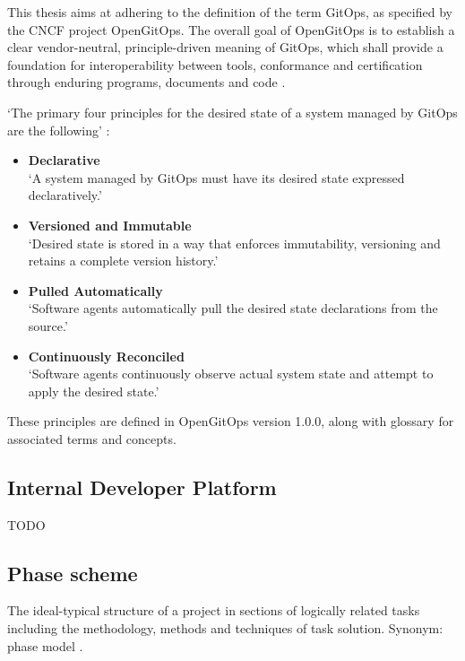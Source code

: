 This thesis aims at adhering to the definition of the term GitOps,
as specified by the CNCF project OpenGitOps.
The overall goal of OpenGitOps is to establish a clear vendor-neutral,
principle-driven meaning of GitOps,
which shall provide a foundation for interoperability between tools, conformance and certification through enduring programs, documents and code
\autocite{opengitopsDocuments}.

\noindent
\enquote*{The primary four principles
	for the desired state of a
	system managed by GitOps are the following} \autocite{gitopsPrinciplesv100}:

\begin{itemize}
	\item \textbf{Declarative} \\
	\enquote*{A system managed by GitOps must have its desired state expressed declaratively.}
	\item \textbf{Versioned and Immutable} \\
	\enquote*{Desired state is stored in a way that enforces immutability, versioning and retains a complete version history.}
	\item \textbf{Pulled Automatically} \\
	\enquote*{Software agents automatically pull the desired state declarations from the source.}
	\item \textbf{Continuously Reconciled} \\
	\enquote*{Software agents continuously observe actual system state and attempt to apply the desired state.}
	\autocite{gitopsPrinciplesv100}
\end{itemize}


These principles are defined in OpenGitOps version 1.0.0,
along with glossary
\autocite{gitopsGlossary}
for associated terms and concepts.

\subsection*{Internal Developer Platform}

TODO

\subsection*{Phase scheme}
The ideal-typical structure of a project in sections of logically related tasks including the methodology,
methods and techniques of task solution. Synonym: phase model
\autocite{riedlManagementInformatik2019}.

